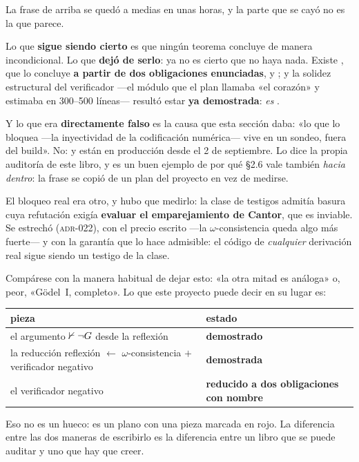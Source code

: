 \begin{observacion}
La frase de arriba se quedó a medias en unas horas, y la parte que se cayó no es la que parece.

Lo que \textbf{sigue siendo cierto} es que ningún teorema concluye  de manera
incondicional. Lo que \textbf{dejó de serlo}: ya no es cierto que no haya nada. Existe
, que lo concluye \textbf{a partir de dos obligaciones enunciadas},
 y ; y la solidez estructural del verificador —el módulo
que el plan llamaba «el corazón» y estimaba en 300--500 líneas— resultó estar \textbf{ya
demostrada}:  \emph{es} .

Y lo que era \textbf{directamente falso} es la causa que esta sección daba: «lo que lo bloquea
—la inyectividad de la codificación numérica— vive en un sondeo, fuera del build». No: 
y  están en producción desde el 2 de septiembre. Lo dice la propia auditoría de
este libro, y es un buen ejemplo de por qué §2.6 vale también \emph{hacia dentro}: la frase se
copió de un plan del proyecto en vez de medirse.

El bloqueo real era otro, y hubo que medirlo: la clase de testigos admitía basura cuya refutación
exigía \textbf{evaluar el emparejamiento de Cantor}, que es inviable. Se estrechó
(\textsc{adr}-022), con el precio escrito —la $\omega$-consistencia queda algo más fuerte— y con
la garantía que lo hace admisible: el código de \emph{cualquier} derivación real sigue siendo un
testigo de la clase.
\end{observacion}

\avisomediagodel

\begin{leccion}
Compárese con la manera habitual de dejar esto: «la otra mitad es análoga» o, peor, «Gödel~I,
completo». Lo que este proyecto puede decir en su lugar es:

\begin{center}\small
\begin{tabularx}{\linewidth}{@{}l >{\raggedright\arraybackslash}X@{}}
\toprule
pieza & estado \\
\midrule
el argumento $\nvdash\lnot G$ desde la reflexión & \textbf{demostrado} \\
la reducción reflexión $\leftarrow$ $\omega$-consistencia $+$ verificador negativo & \textbf{demostrada} \\
el verificador negativo & \textbf{reducido a dos obligaciones con nombre} \\
\bottomrule
\end{tabularx}
\end{center}

Eso no es un hueco: es un plano con una pieza marcada en rojo. La diferencia entre las dos maneras
de escribirlo es la diferencia entre un libro que se puede auditar y uno que hay que creer.
\end{leccion}

